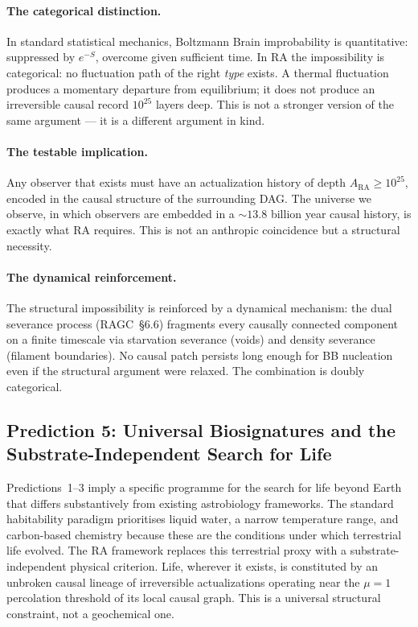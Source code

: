 \documentclass[11pt,a4paper]{article}
\theoremstyle{plain}
\theoremstyle{definition}
\theoremstyle{remark}
\newcommand{\ARA}{A_{\mathrm{RA}}}
\begin{document}
\paragraph{The categorical distinction.}
In standard statistical mechanics, Boltzmann Brain improbability is quantitative:
suppressed by $e^{-S}$, overcome given sufficient time. In RA the impossibility is
categorical: no fluctuation path of the right \emph{type} exists. A thermal
fluctuation produces a momentary departure from equilibrium; it does not produce an
irreversible causal record $10^{25}$ layers deep. This is not a stronger version
of the same argument --- it is a different argument in kind.

\paragraph{The testable implication.}
Any observer that exists must have an actualization history of depth $\ARA \geq
10^{25}$, encoded in the causal structure of the surrounding DAG. The universe we
observe, in which observers are embedded in a $\sim 13.8$ billion year causal
history, is exactly what RA requires. This is not an anthropic coincidence but a
structural necessity.

\paragraph{The dynamical reinforcement.}
The structural impossibility is reinforced by a dynamical mechanism: the
dual severance process (RAGC~\S6.6) fragments every causally connected
component on a finite timescale via starvation severance (voids) and
density severance (filament boundaries). No causal patch persists long
enough for BB nucleation even if the structural argument were relaxed.
The combination is doubly categorical.

\subsection{Prediction 5: Universal Biosignatures and the Substrate-Independent
Search for Life}
\label{sec:prediction5}

Predictions~1--3 imply a specific programme for the search for life beyond
Earth that differs substantively from existing astrobiology frameworks. The
standard habitability paradigm prioritises liquid water, a narrow temperature
range, and carbon-based chemistry because these are the conditions under which
terrestrial life evolved. The RA framework replaces this terrestrial proxy
with a substrate-independent physical criterion. Life, wherever it exists, is
constituted by an unbroken causal lineage of irreversible actualizations
operating near the $\mu = 1$ percolation threshold of its local causal graph.
This is a universal structural constraint, not a geochemical one.
\end{document}
